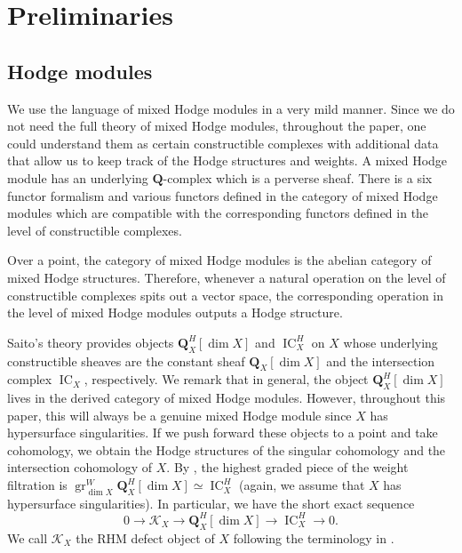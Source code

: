 \documentclass[letterpaper,11pt]{amsart}
\theoremstyle{plain}
\theoremstyle{definition}
\theoremstyle{remark}
\newcommand{\QQ}{\mathbf{Q}}
\newcommand{\cK}{\mathcal{K}}
\DeclareMathOperator{\gr}{gr}
\DeclareMathOperator{\IC}{IC}
\begin{document}
    \section{Preliminaries}
    \subsection{Hodge modules}
    We use the language of mixed Hodge modules \cite{saito1988modulesdeHodge,saito1990mixedHodgemodules} in a very mild manner. Since we do not need the full theory of mixed Hodge modules, throughout the paper, one could understand them as certain constructible complexes with additional data that allow us to keep track of the Hodge structures and weights. A mixed Hodge module has an underlying $\QQ$-complex which is a perverse sheaf. There is a six functor formalism and various functors defined in the category of mixed Hodge modules which are compatible with the corresponding functors defined in the level of constructible complexes.
    
    Over a point, the category of mixed Hodge modules is the abelian category of mixed Hodge structures. Therefore, whenever a natural operation on the level of constructible complexes spits out a vector space, the corresponding operation in the level of mixed Hodge modules outputs a Hodge structure.
    
    Saito's theory provides objects $\QQ_{X}^{H}[\dim X]$ and $\IC_{X}^{H}$ on $X$ whose underlying constructible sheaves are the constant sheaf $\QQ_{X}[\dim X]$ and the intersection complex $\IC_{X}$, respectively. We remark that in general, the object $\QQ_{X}^{H}[\dim X]$ lives in the derived category of mixed Hodge modules. However, throughout this paper, this will always be a genuine mixed Hodge module since $X$ has hypersurface singularities. If we push forward these objects to a point and take cohomology, we obtain the Hodge structures of the singular cohomology and the intersection cohomology of $X$. By \cite{saito1990mixedHodgemodules}, the highest graded piece of the weight filtration is $\gr_{\dim X}^{W}\QQ_{X}^{H}[\dim X] \simeq \IC_{X}^{H}$ (again, we assume that $X$ has hypersurface singularities). In particular, we have the short exact sequence
    $$0 \to \cK_{X} \to \QQ_{X}^{H}[\dim X] \to \IC_{X}^{H} \to 0. $$
    We call $\cK_{X}$ the RHM defect object of $X$ following the terminology in \cite{park-popa:lefschetz-Hodge-symmetry}.
\end{document}
